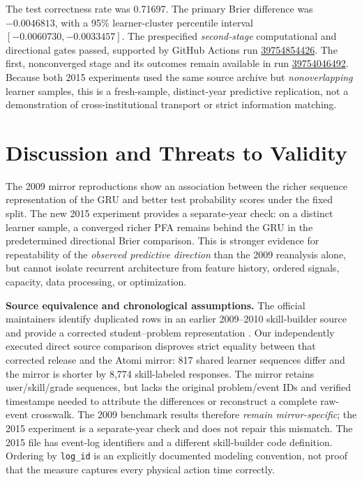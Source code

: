 \documentclass[11pt,a4paper]{article}
\begin{document}
The test correctness rate was 0.71697. The primary Brier difference was $-0.0046813$, with a 95\% learner-cluster percentile interval $[-0.0060730,-0.0033457]$. The prespecified \emph{second-stage} computational and directional gates passed, supported by GitHub Actions run \href{https://github.com/devissaputra/knowledge_tracing_benchmark/actions/runs/39754854426}{39754854426}. The first, nonconverged stage and its outcomes remain available in run \href{https://github.com/devissaputra/knowledge_tracing_benchmark/actions/runs/39754046492}{39754046492}. Because both 2015 experiments used the same source archive but \emph{nonoverlapping} learner samples, this is a fresh-sample, distinct-year predictive replication, not a demonstration of cross-institutional transport or strict information matching.

\section{Discussion and Threats to Validity}
The 2009 mirror reproductions show an association between the richer sequence representation of the GRU and better test probability scores under the fixed split. The new 2015 experiment provides a separate-year check: on a distinct learner sample, a converged richer PFA remains behind the GRU in the predetermined directional Brier comparison. This is stronger evidence for repeatability of the \emph{observed predictive direction} than the 2009 reanalysis alone, but cannot isolate recurrent architecture from feature history, ordered signals, capacity, data processing, or optimization.

\textbf{Source equivalence and chronological assumptions.} The official maintainers identify duplicated rows in an earlier 2009--2010 skill-builder source and provide a corrected student--problem representation \citep{assistmentsdata}. Our independently executed direct source comparison disproves strict equality between that corrected release and the Atomi mirror: 817 shared learner sequences differ and the mirror is shorter by 8,774 skill-labeled responses. The mirror retains user/skill/grade sequences, but lacks the original problem/event IDs and verified timestamps needed to attribute the differences or reconstruct a complete raw-event crosswalk. The 2009 benchmark results therefore \emph{remain mirror-specific}; the 2015 experiment is a separate-year check and does not repair this mismatch. The 2015 file has event-log identifiers and a different skill-builder code definition. Ordering by \texttt{log\_id} is an explicitly documented modeling convention, not proof that the measure captures every physical action time correctly.
\end{document}

